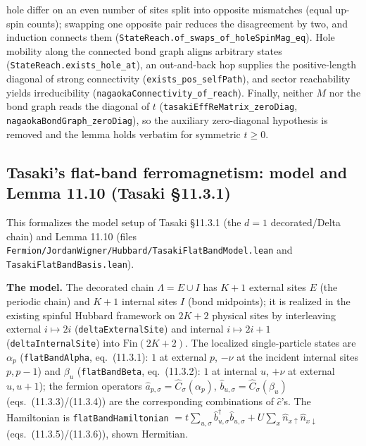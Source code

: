 \documentclass[a4paper,11pt]{article}
\begin{document}
\begin{enumerate}
  hole differ on an even number of sites split into opposite mismatches
  (equal up-spin counts); swapping one opposite pair reduces the disagreement
  by two, and induction connects them
  (\texttt{StateReach.of\_swaps\_of\_holeSpinMag\_eq}). Hole mobility along the
  connected bond graph aligns arbitrary states
  (\texttt{StateReach.exists\_hole\_at}), an out-and-back hop supplies the
  positive-length diagonal of strong connectivity
  (\texttt{exists\_pos\_selfPath}), and sector reachability yields
  irreducibility (\texttt{nagaokaConnectivity\_of\_reach}). Finally, neither
  \(M\) nor the bond graph reads the diagonal of \(t\)
  (\texttt{tasakiEffReMatrix\_zeroDiag}, \texttt{nagaokaBondGraph\_zeroDiag}),
  so the auxiliary zero-diagonal hypothesis is removed and the lemma holds
  verbatim for symmetric \(t \ge 0\).
\end{enumerate}

\subsection{Tasaki's flat-band ferromagnetism: model and Lemma 11.10
  (Tasaki §11.3.1)}
\label{subsec:tasaki-flatband}

\noindent This formalizes the model setup of Tasaki §11.3.1 (the $d=1$
decorated/Delta chain) and Lemma 11.10 (files
\texttt{Fermion/JordanWigner/Hubbard/TasakiFlatBandModel.lean} and
\texttt{TasakiFlatBandBasis.lean}).

\medskip
\noindent\textbf{The model.}
The decorated chain $\Lambda = E \cup I$ has $K+1$ external sites $E$ (the
periodic chain) and $K+1$ internal sites $I$ (bond midpoints); it is realized in
the existing spinful Hubbard framework on $2K+2$ physical sites by interleaving
external $i \mapsto 2i$ (\texttt{deltaExternalSite}) and internal $i \mapsto 2i+1$
(\texttt{deltaInternalSite}) into $\mathrm{Fin}(2K+2)$. The localized
single-particle states are $\alpha_p$ (\texttt{flatBandAlpha}, eq.~(11.3.1):
$1$ at external $p$, $-\nu$ at the incident internal sites $p, p-1$) and $\beta_u$
(\texttt{flatBandBeta}, eq.~(11.3.2): $1$ at internal $u$, $+\nu$ at external
$u, u+1$); the fermion operators $\hat a_{p,\sigma} = \hat C_\sigma(\alpha_p)$,
$\hat b_{u,\sigma} = \hat C_\sigma(\beta_u)$ (eqs.~(11.3.3)/(11.3.4)) are the
corresponding combinations of $\hat c$'s. The Hamiltonian is
\texttt{flatBandHamiltonian} $= t\sum_{u,\sigma}\hat b^\dagger_{u,\sigma}
\hat b_{u,\sigma} + U\sum_x \hat n_{x\uparrow}\hat n_{x\downarrow}$
(eqs.~(11.3.5)/(11.3.6)), shown Hermitian.
\end{document}
